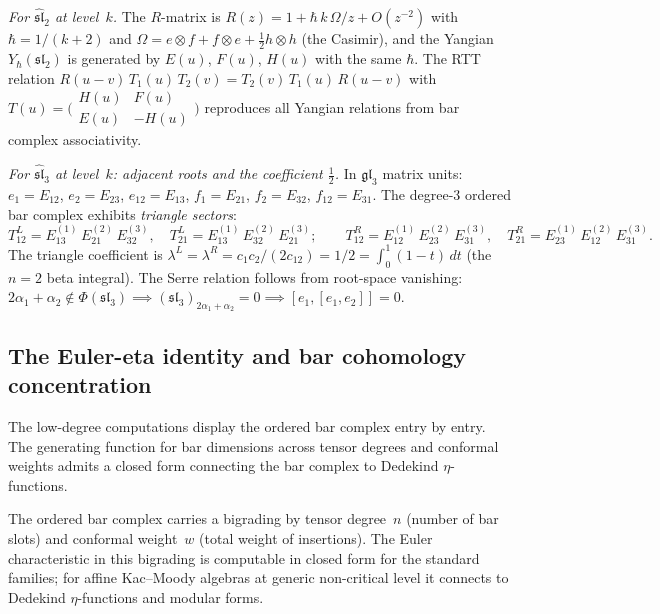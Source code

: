 \begin{construction}
\emph{For $\widehat{\mathfrak{sl}}_2$ at level~$k$.}
The $R$-matrix is $R(z)=1+\hbar\,k\,\Omega/z+O(z^{-2})$ with
$\hbar=1/(k+2)$ and
$\Omega=e\otimes f+f\otimes e+\tfrac12 h\otimes h$
(the Casimir), and the Yangian $Y_\hbar(\mathfrak{sl}_2)$
is generated by $E(u)$, $F(u)$, $H(u)$ with
the same $\hbar$. The RTT relation
$R(u{-}v)\,T_1(u)\,T_2(v)=T_2(v)\,T_1(u)\,R(u{-}v)$
with $T(u)=\bigl(\begin{smallmatrix}
H(u) & F(u) \\ E(u) & -H(u)
\end{smallmatrix}\bigr)$
reproduces all Yangian relations from bar complex
associativity.

\emph{For $\widehat{\mathfrak{sl}}_3$ at level~$k$:
adjacent roots and the coefficient $\frac12$.}
In $\mathfrak{gl}_3$ matrix units:
$e_1=E_{12}$, $e_2=E_{23}$, $e_{12}=E_{13}$,
$f_1=E_{21}$, $f_2=E_{32}$, $f_{12}=E_{31}$.
The degree-$3$ ordered bar complex exhibits
\emph{triangle sectors}:
\[
T^L_{12}=E_{13}^{(1)}\,E_{21}^{(2)}\,E_{32}^{(3)},
\quad
T^L_{21}=E_{13}^{(1)}\,E_{32}^{(2)}\,E_{21}^{(3)};
\qquad
T^R_{12}=E_{12}^{(1)}\,E_{23}^{(2)}\,E_{31}^{(3)},
\quad
T^R_{21}=E_{23}^{(1)}\,E_{12}^{(2)}\,E_{31}^{(3)}.
\]
The triangle coefficient is
$\lambda^L=\lambda^R=c_1 c_2/(2c_{12})=1/2=\int_0^1(1-t)\,dt$
(the $n=2$ beta integral). The Serre relation follows from
root-space vanishing:
$2\alpha_1+\alpha_2\notin\Phi(\mathfrak{sl}_3)
\implies (\mathfrak{sl}_3)_{2\alpha_1+\alpha_2}=0
\implies [e_1,[e_1,e_2]]=0$.
\end{construction}

\subsection{The Euler-eta identity and bar cohomology concentration}
\label{subsec:euler-eta-identity}

The low-degree computations display the ordered bar complex entry
by entry. The generating function for bar dimensions across tensor
degrees and conformal weights admits a closed form connecting the
bar complex to Dedekind $\eta$-functions.

The ordered bar complex carries a bigrading by tensor degree~$n$
(number of bar slots) and conformal weight~$w$ (total weight of
insertions). The Euler characteristic in this bigrading is
computable in closed form for the standard families; for affine
Kac--Moody algebras at generic non-critical level it connects to
Dedekind $\eta$-functions and modular forms.


